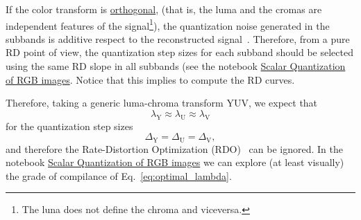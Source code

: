 If the color transform is
\href{https://en.wikipedia.org/wiki/Orthogonal_transformation}{orthogonal},
(that is, the luma and the cromas are independent features of the
signal\footnote{The luna does not define the chroma and viceversa.}),
the quantization noise generated in the subbands is additive respect
to the reconstructed signal~\cite{burger2016digital}. Therefore, from
a pure RD point of view, the quantization step sizes for each subband
should be selected using the same RD slope in all subbands (see the
notebook
\href{https://github.com/vicente-gonzalez-ruiz/color_transforms/blob/main/docs/RGB/RGB_SQ.ipynb}{Scalar
  Quantization of RGB images}. Notice that this implies to compute the
RD curves.

Therefore, taking a generic luma-chroma transform $\text{YUV}$, we
expect that
\begin{equation}
  \lambda_{\text{Y}} \approx \lambda_{\text{U}} \approx \lambda_{\text{V}}
  \label{eq:optimal_lambda}
\end{equation}
for the quantization step sizes
\begin{equation}
  \Delta_{\text{Y}} = \Delta_{\text{U}} = \Delta_{\text{V}},
  \label{eq:optimal_delta}
\end{equation}
and therefore the Rate-Distortion Optimization
(RDO)~\cite{vruiz__information_theory} can be ignored. In the notebook
\href{https://github.com/Sistemas-Multimedia/Sistemas-Multimedia.github.io/blob/master/contents/RGB_SQ/RGB_SQ.ipynb}{Scalar
  Quantization of RGB images} we can explore (at least visually) the
grade of compilance of Eq.~\eqref{eq:optimal_lambda}.

